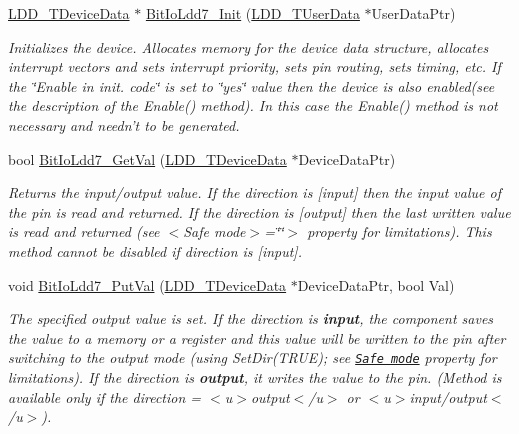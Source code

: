 \begin{DoxyCompactItemize}
\item 
\hyperlink{group___p_e___types__module_gac5cf1362f1f0e3a2ce71b1bf2276d091}{L\-D\-D\-\_\-\-T\-Device\-Data} $\ast$ \hyperlink{group___bit_io_ldd7__module_gaa210933c93b15395117454a2a398c7fc}{Bit\-Io\-Ldd7\-\_\-\-Init} (\hyperlink{group___p_e___types__module_ga0b66a73f87238a782318aa0be7578e35}{L\-D\-D\-\_\-\-T\-User\-Data} $\ast$User\-Data\-Ptr)
\begin{DoxyCompactList}\small\item\em Initializes the device. Allocates memory for the device data structure, allocates interrupt vectors and sets interrupt priority, sets pin routing, sets timing, etc. If the \char`\"{}\-Enable
    in init. code\char`\"{} is set to \char`\"{}yes\char`\"{} value then the device is also enabled(see the description of the Enable() method). In this case the Enable() method is not necessary and needn't to be generated. \end{DoxyCompactList}\item 
bool \hyperlink{group___bit_io_ldd7__module_ga3ee3dd087f234ca3a6c498e95a6b8f9b}{Bit\-Io\-Ldd7\-\_\-\-Get\-Val} (\hyperlink{group___p_e___types__module_gac5cf1362f1f0e3a2ce71b1bf2276d091}{L\-D\-D\-\_\-\-T\-Device\-Data} $\ast$Device\-Data\-Ptr)
\begin{DoxyCompactList}\small\item\em Returns the input/output value. If the direction is \mbox{[}input\mbox{]} then the input value of the pin is read and returned. If the direction is \mbox{[}output\mbox{]} then the last written value is read and returned (see $<$\-Safe mode$>$=\char`\"{}\char`\"{}$>$ property for limitations). This method cannot be disabled if direction is \mbox{[}input\mbox{]}. \end{DoxyCompactList}\item 
void \hyperlink{group___bit_io_ldd7__module_ga5ed462070056354e28dd16e59c3cf772}{Bit\-Io\-Ldd7\-\_\-\-Put\-Val} (\hyperlink{group___p_e___types__module_gac5cf1362f1f0e3a2ce71b1bf2276d091}{L\-D\-D\-\_\-\-T\-Device\-Data} $\ast$Device\-Data\-Ptr, bool Val)
\begin{DoxyCompactList}\small\item\em The specified output value is set. If the direction is {\bfseries  input}, the component saves the value to a memory or a register and this value will be written to the pin after switching to the output mode (using {\ttfamily Set\-Dir(\-T\-R\-U\-E)}; see \href{BitIOProperties.html#SafeMode}{\tt Safe mode} property for limitations). If the direction is {\bfseries output}, it writes the value to the pin. (Method is available only if the direction = $<$u$>${\ttfamily output}$<$/u$>$ or $<$u$>${\ttfamily  input/output}$<$/u$>$). \end{DoxyCompactList}\item 

\end{DoxyCompactItemize}
